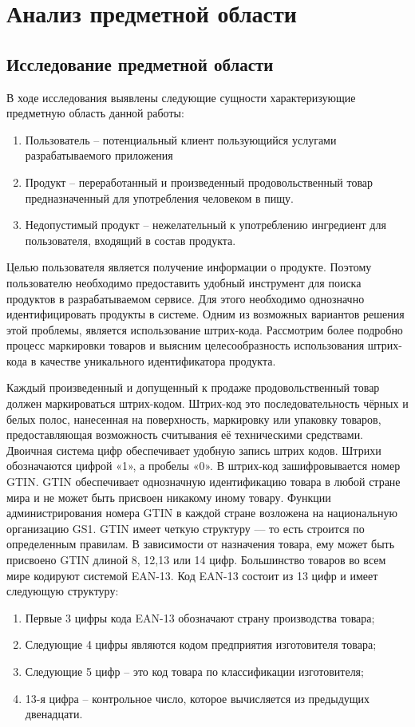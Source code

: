 \section{Анализ предметной области}

\subsection{Исследование предметной области}

В ходе исследования выявлены следующие сущности характеризующие предметную область данной работы:
\begin{enumerate}
	\item Пользователь -- потенциальный клиент пользующийся услугами разрабатываемого приложения
	\item Продукт -- переработанный и произведенный продовольственный товар предназначенный для употребления человеком в пищу. 
	\item Недопустимый продукт -- нежелательный к употреблению ингредиент для пользователя, входящий в состав продукта. 
\end{enumerate} 

Целью пользователя является получение информации о продукте. Поэтому пользователю необходимо предоставить удобный инструмент для поиска продуктов в разрабатываемом сервисе. Для этого необходимо однозначно идентифицировать продукты в системе. Одним из возможных вариантов решения этой проблемы, является использование штрих-кода. 
Рассмотрим более подробно процесс маркировки товаров и выясним целесообразность использования штрих-кода в качестве уникального идентификатора продукта. 

Каждый произведенный и допущенный к продаже продовольственный товар должен маркироваться штрих-кодом. Штрих-код это последовательность чёрных и белых полос, нанесенная на поверхность, маркировку или упаковку товаров, предоставляющая возможность считывания её техническими средствами. Двоичная система цифр обеспечивает удобную запись штрих кодов. Штрихи обозначаются цифрой «1», а пробелы «0».
В штрих-код зашифровывается номер GTIN. GTIN обеспечивает однозначную идентификацию товара в любой стране мира и не может быть присвоен никакому иному товару. Функции администрирования номера GTIN в каждой стране возложена на национальную организацию GS1. GTIN имеет четкую структуру — то есть строится по определенным правилам. В зависимости от назначения товара, ему может быть присвоено GTIN длиной 8, 12,13 или 14 цифр. Большинство товаров во всем мире кодируют системой EAN-13. Код EAN-13 состоит из 13 цифр и имеет следующую структуру:
\begin{enumerate}
	\item Первые 3 цифры кода EAN-13 обозначают страну производства товара;
	\item Следующие 4 цифры являются кодом предприятия изготовителя товара;
	\item Следующие 5 цифр – это код товара по классификации изготовителя;
	\item 13-я цифра – контрольное число, которое вычисляется из предыдущих двенадцати.
\end{enumerate} 

